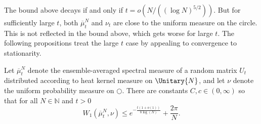 The bound above decays if and only if $t=o(N/((\log N)^{5/2}))$. But for sufficiently large $t$, both $\overline{\mu}^N_t$ and $\nu_t$ are close to the uniform measure on the circle. This is not reflected in the bound above, which gets worse for large $t$. The following propositions treat the large $t$ case by appealing to convergence to stationarity.

\begin{prop}\label{T:avg-to-uniform}
Let $\overline{\mu}^N_t$ denote the ensemble-averaged spectral measure of a random matrix $U_t$ distributed according to heat kernel measure on $\Unitary{N}$, and let $\nu$ denote the uniform probability measure on $\Circle$. There are constants $C,c\in(0,\infty)$ so that for all $N\in\mathbb{N}$ and $t>0$
\[
W_1(\overline{\mu}^N_t,\nu)\le e^{-\frac{t(1+o(1))}{8\log(N)}}+\frac{2\pi}{N}.
\]
\end{prop}

